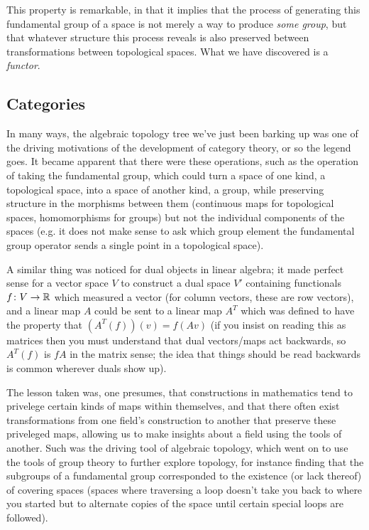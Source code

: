 \documentclass[11pt]{article}
\begin{document}
This property is remarkable, in that it implies that the process of generating this fundamental group of a space is not merely a way to produce \emph{some group}, but that whatever structure this process reveals is also preserved between transformations between topological spaces. What we have discovered is a \emph{functor}.

\subsection{Categories}

In many ways, the algebraic topology tree we've just been barking up was one of the driving motivations of the development of category theory, or so the legend goes. It became apparent that there were these operations, such as the operation of taking the fundamental group, which could turn a space of one kind, a topological space, into a space of another kind, a group, while preserving structure in the morphisms between them (continuous maps for topological spaces, homomorphisms for groups) but not the individual components of the spaces (e.g. it does not make sense to ask which group element the fundamental group operator sends a single point in a topological space).

A similar thing was noticed for dual objects in linear algebra; it made perfect sense for a vector space $V$ to construct a dual space $V'$ containing functionals $f\colon V \to \mathbb{R}$ which measured a vector (for column vectors, these are row vectors), and a linear map $A$ could be sent to a linear map $A^T$ which was defined to have the property that $(A^T(f))(v) = f(Av)$ (if you insist on reading this as matrices then you must understand that dual vectors/maps act backwards, so $A^T(f)$ is $fA$ in the matrix sense; the idea that things should be read backwards is common wherever duals show up).

The lesson taken was, one presumes, that constructions in mathematics tend to privelege certain kinds of maps within themselves, and that there often exist transformations from one field's construction to another that preserve these priveleged maps, allowing us to make insights about a field using the tools of another. Such was the driving tool of algebraic topology, which went on to use the tools of group theory to further explore topology, for instance finding that the subgroups of a fundamental group corresponded to the existence (or lack thereof) of covering spaces (spaces where traversing a loop doesn't take you back to where you started but to alternate copies of the space until certain special loops are followed).
\end{document}

